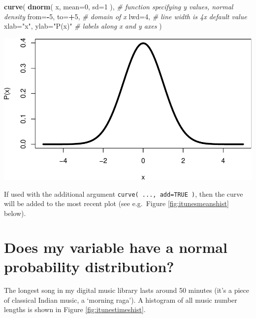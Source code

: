 \documentclass[
]{book}
\newenvironment{Shaded}{\begin{snugshade}}{\end{snugshade}}
\newcommand{\AttributeTok}[1]{\textcolor[rgb]{0.13,0.29,0.53}{#1}}
\newcommand{\CommentTok}[1]{\textcolor[rgb]{0.56,0.35,0.01}{\textit{#1}}}
\newcommand{\DecValTok}[1]{\textcolor[rgb]{0.00,0.00,0.81}{#1}}
\newcommand{\FunctionTok}[1]{\textcolor[rgb]{0.13,0.29,0.53}{\textbf{#1}}}
\newcommand{\NormalTok}[1]{#1}
\newcommand{\SpecialCharTok}[1]{\textcolor[rgb]{0.81,0.36,0.00}{\textbf{#1}}}
\newcommand{\StringTok}[1]{\textcolor[rgb]{0.31,0.60,0.02}{#1}}
\begin{document}
\begin{Shaded}
\begin{Highlighting}[]
\FunctionTok{curve}\NormalTok{( }\FunctionTok{dnorm}\NormalTok{( x, }\AttributeTok{mean=}\DecValTok{0}\NormalTok{, }\AttributeTok{sd=}\DecValTok{1}\NormalTok{ ), }\CommentTok{\# function specifying y values, normal density}
       \AttributeTok{from=}\SpecialCharTok{{-}}\DecValTok{5}\NormalTok{, }\AttributeTok{to=}\SpecialCharTok{+}\DecValTok{5}\NormalTok{, }\CommentTok{\# domain of x}
       \AttributeTok{lwd=}\DecValTok{4}\NormalTok{, }\CommentTok{\# line width is 4x default value}
       \AttributeTok{xlab=}\StringTok{"x"}\NormalTok{, }\AttributeTok{ylab=}\StringTok{"P(x)"} \CommentTok{\# labels along x and y axes}
\NormalTok{       )}
\end{Highlighting}
\end{Shaded}

\includegraphics{QMS-EN_files/figure-latex/curve.dnorm-1.pdf}

If used with the additional argument \texttt{curve(\ ...,\ add=TRUE\ )}, then the curve will be added to the most recent plot (see e.g.~Figure \ref{fig:itunesmeanshist} below).

\hypertarget{sec:isvarnormaldistributed}{%
\section{Does my variable have a normal probability distribution?}\label{sec:isvarnormaldistributed}}

The longest song in my digital music library lasts around 50
minutes (it's a piece of classical Indian music, a `morning raga').
A histogram of all music number lengths is shown in
Figure \ref{fig:itunestimeshist}.
\end{document}
